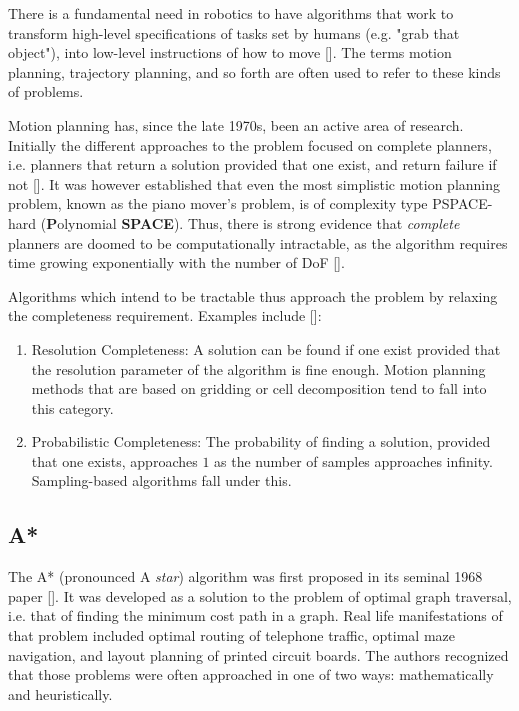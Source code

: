 There is a fundamental need in robotics to have algorithms that work to transform high-level specifications of tasks set by humans (e.g. "grab that object"), into low-level instructions of how to move [\citeauthor{LaValle2006}]. The terms motion planning, trajectory planning, and so forth are often used to refer to these kinds of problems.

Motion planning has, since the late 1970s, been an active area of research. Initially the different approaches to the problem focused on complete planners, i.e. planners that return a solution provided that one exist, and return failure if not [\citeauthor{Karaman2010}]. It was however established that even the most simplistic motion planning problem, known as the piano mover's problem, is of complexity type PSPACE-hard (\textbf{P}olynomial \textbf{SPACE}). Thus, there is strong evidence that \textit{complete} planners are doomed to be computationally intractable, as the algorithm requires time growing exponentially with the number of DoF [\citeauthor{Reif1985}].

Algorithms which intend to be tractable thus approach the problem by relaxing the completeness requirement. Examples include [\citeauthor{Karaman2010}]:

\begin{enumerate}
	\item Resolution Completeness: A solution can be found if one exist provided that the resolution parameter of the algorithm is fine enough. Motion planning methods that are based on gridding or cell decomposition tend to fall into this category.
	\item Probabilistic Completeness: The probability of finding a solution, provided that one exists, approaches $1$ as the number of samples approaches infinity. Sampling-based algorithms fall under this.
\end{enumerate}



\subsection{A*} \label{subsec:Astar}

The A* (pronounced A \textit{star}) algorithm was first proposed in its seminal 1968 paper [\citeauthor{PeterE.HAR}]. It was developed as a solution to the problem of optimal graph traversal, i.e. that of finding the minimum cost path in a graph. Real life manifestations of that problem included optimal routing of telephone traffic, optimal maze navigation, and layout planning of printed circuit boards. The authors recognized that those problems were often approached in one of two ways: mathematically and heuristically. 

